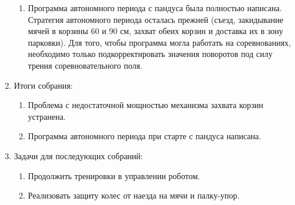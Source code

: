 \begin{enumerate}
\begin{enumerate}
		\item Программа автономного периода с пандуса была полностью написана. Стратегия автономного периода осталась прежней (съезд, закидывание мячей в корзины 60 и 90 см, захват обеих корзин и доставка их в зону парковки). Для того, чтобы программа могла работать на соревнованиях, необходимо только подкорректировать значения поворотов под силу трения соревновательного поля.

	\end{enumerate}
	
	\item Итоги собрания:
	\begin{enumerate}
		
		\item Проблема с недостаточной мощностью механизма захвата корзин устранена.
		
		\item Программа автономного периода при старте с пандуса написана.
		
	\end{enumerate}
	
	\item Задачи для последующих собраний:
	\begin{enumerate}
		
		\item Продолжить тренировки в управлении роботом.
		
		\item Реализовать защиту колес от наезда на мячи и палку-упор.
			
	\end{enumerate}
\end{enumerate}
\fillpage
